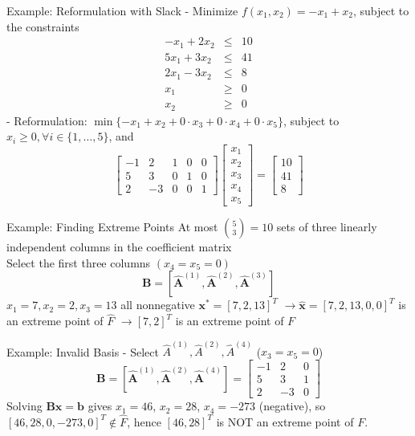 \documentclass[aspectratio=169,hyperref,UTF8,CJK]{beamer}
\begin{document}
\begin{frame}{Example: Reformulation with Slack}
- Minimize \(f(x_1, x_2) = -x_1 + x_2\), subject to the constraints
\begin{align*}
-x_1 + 2x_2 & \leq & 10 \\
5x_1 + 3x_2 & \leq & 41 \\
2x_1 - 3x_2 & \leq & 8 \\
x_1 & \geq & 0 \\
x_2 & \geq & 0
\end{align*}
- Reformulation: \(\min \{-x_1 + x_2 + 0 \cdot x_3 + 0 \cdot x_4 + 0 \cdot x_5\}\), subject to \(x_i \geq 0, \forall i \in \{1, \ldots, 5\}\), and
\[
\begin{bmatrix}
-1 & 2 & 1 & 0 & 0 \\
5 & 3 & 0 & 1 & 0 \\
2 & -3 & 0 & 0 & 1
\end{bmatrix}
\begin{bmatrix}
x_1 \\
x_2 \\
x_3 \\
x_4 \\
x_5
\end{bmatrix}
=
\begin{bmatrix}
10 \\
41 \\
8
\end{bmatrix}
\]
\end{frame}

\begin{frame}{Example: Finding Extreme Points}
At most \(\binom{5}{3} = 10\) sets of three linearly independent columns in the coefficient matrix \\
Select the first three columns \((x_{4} = x_{5} = 0)\)
\[
\mathbf{B} = [\hat{\mathbf{A}}^{(1)},\hat{\mathbf{A}}^{(2)},\hat{\mathbf{A}}^{(3)}]
\]
\(x_{1} = 7,x_{2} = 2,x_{3} = 13\) all nonnegative \(\mathbf{x}^{*} = [7,2,13]^{T}\) \(\rightarrow \hat{\mathbf{x}} = [7,2,13,0,0]^{T}\) is an extreme point of \(\hat{F}\) \(\rightarrow [7,2]^{T}\) is an extreme point of \(F\)
\end{frame}

\begin{frame}{Example: Invalid Basis}
- Select \(\hat{A}^{(1)}, \hat{A}^{(2)}, \hat{A}^{(4)}\) (\(x_3=x_5=0\))
\[
\mathbf{B} = [\hat{\mathbf{A}}^{(1)},\hat{\mathbf{A}}^{(2)},\hat{\mathbf{A}}^{(4)}]
= \begin{bmatrix}
-1 & 2 & 0 \\
5 & 3 & 1 \\
2 & -3 & 0
\end{bmatrix}
\]
Solving \(\mathbf{B}\mathbf{x}=\mathbf{b}\) gives \(x_1=46\), \(x_2=28\), \(x_4=-273\) (negative), so \([46,28,0,-273,0]^T\notin\hat{F}\), hence \([46,28]^T\) is NOT an extreme point of \(F\).
\end{frame}
\end{document}
